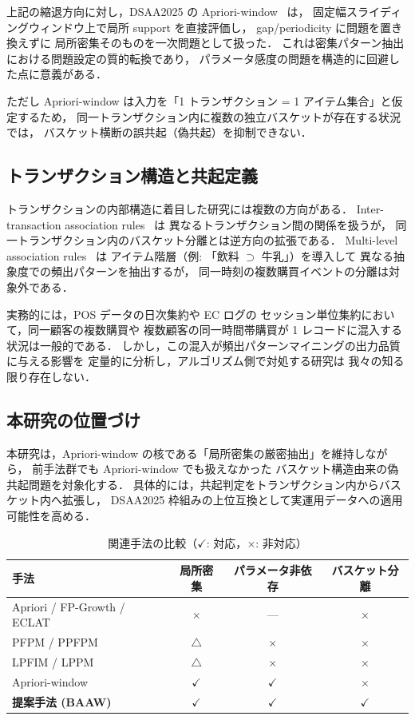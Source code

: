上記の縮退方向に対し，DSAA2025 の Apriori-window~\cite{dsaa2025} は，
固定幅スライディングウィンドウ上で局所 support を直接評価し，
gap/periodicity に問題を置き換えずに
局所密集そのものを一次問題として扱った．
これは密集パターン抽出における問題設定の質的転換であり，
パラメータ感度の問題を構造的に回避した点に意義がある．

ただし Apriori-window は入力を「1 トランザクション = 1 アイテム集合」と仮定するため，
同一トランザクション内に複数の独立バスケットが存在する状況では，
バスケット横断の誤共起（偽共起）を抑制できない．

\subsection{トランザクション構造と共起定義}
\label{sec:related_structure}

トランザクションの内部構造に着目した研究には複数の方向がある．
Inter-transaction association rules~\cite{lu2000inter} は
異なるトランザクション間の関係を扱うが，
同一トランザクション内のバスケット分離とは逆方向の拡張である．
Multi-level association rules~\cite{han1999mining} は
アイテム階層（例: 「飲料 $\supset$ 牛乳」）を導入して
異なる抽象度での頻出パターンを抽出するが，
同一時刻の複数購買イベントの分離は対象外である．

実務的には，POS データの日次集約や EC ログの
セッション単位集約において，同一顧客の複数購買や
複数顧客の同一時間帯購買が 1 レコードに混入する状況は一般的である．
しかし，この混入が頻出パターンマイニングの出力品質に与える影響を
定量的に分析し，アルゴリズム側で対処する研究は
我々の知る限り存在しない．

\subsection{本研究の位置づけ}
\label{sec:related_positioning}

本研究は，Apriori-window の核である「局所密集の厳密抽出」を維持しながら，
前手法群でも Apriori-window でも扱えなかった
バスケット構造由来の偽共起問題を対象化する．
具体的には，共起判定をトランザクション内からバスケット内へ拡張し，
DSAA2025 枠組みの上位互換として実運用データへの適用可能性を高める．

\begin{table}[t]
\caption{関連手法の比較（$\checkmark$: 対応，$\times$: 非対応）}
\label{tab:related_comparison}
\centering
\scriptsize
\begin{tabular}{lccc}
\toprule
手法 & 局所密集 & パラメータ非依存 & バスケット分離 \\
\midrule
Apriori / FP-Growth / ECLAT & $\times$ & --- & $\times$ \\
PFPM / PPFPM & $\triangle$ & $\times$ & $\times$ \\
LPFIM / LPPM & $\triangle$ & $\times$ & $\times$ \\
Apriori-window~\cite{dsaa2025} & $\checkmark$ & $\checkmark$ & $\times$ \\
\textbf{提案手法 (BAAW)} & $\checkmark$ & $\checkmark$ & $\checkmark$ \\
\bottomrule
\end{tabular}
\end{table}

